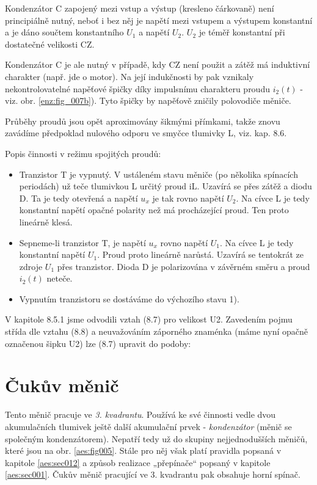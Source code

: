     \begin{tcnote}
      Kondenzátor C zapojený mezi vstup a výstup (kresleno čárkovaně) není principiálně nutný, 
      neboť i bez něj je napětí mezi vstupem a výstupem konstantní a je dáno součtem konstantního 
      \(U_1\) a napětí \(U_2\). \(U_2\) je téměř konstantní při dostatečné velikosti CZ.
      
      Kondenzátor C je ale nutný v případě, kdy CZ není použit a zátěž má induktivní charakter 
      (např. jde o motor). Na její indukčnosti by pak vznikaly nekontrolovatelné napěťové špičky 
      díky impulsnímu charakteru proudu \(i_2(t)\) - viz. obr. \ref{enz:fig_007b}). Tyto špičky by 
      napěťově zničily polovodiče měniče.
    \end{tcnote}
    
    Průběhy proudů jsou opět aproximovány šikmými přímkami, takže znovu zavádíme předpoklad
    nulového odporu ve smyčce tlumivky L, viz. kap. 8.6.
    
    Popis činnosti v režimu spojitých proudů:
    \begin{itemize}
      \item Tranzistor T je vypnutý. V ustáleném stavu měniče (po několika spínacích periodách) už 
            teče tlumivkou L určitý proud iL. Uzavírá se přes zátěž a diodu D. Ta je tedy otevřená 
            a napětí \(u_x\) je tak rovno napětí \(U_2\). Na cívce L je tedy konstantní napětí 
            opačné polarity než má procházející proud. Ten proto lineárně klesá.
      \item Sepneme-li tranzistor T, je napětí \(u_x\) rovno napětí \(U_1\). Na cívce L je tedy 
            konstantní napětí \(U_1\). Proud proto lineárně narůstá. Uzavírá se tentokrát ze zdroje 
            \(U_1\) přes tranzistor. Dioda D je polarizována v závěrném směru a proud \(i_2(t)\) 
            neteče.
      \item Vypnutím tranzistoru se dostáváme do výchozího stavu 1).
    \end{itemize}
    
    V kapitole 8.5.1 jsme odvodili vztah (8.7) pro velikost U2. Zavedením pojmu střída dle vztahu 
    (8.8) a neuvažováním záporného znaménka (máme nyní opačně označenou šipku U2) lze (8.7) upravit 
    do podoby:
    
  \section{Čukův měnič}\label{aes:sec004}
    Tento měnič pracuje ve \emph{3. kvadrantu}. Používá ke své činnosti vedle dvou akumulačních 
    tlumivek ještě další akumulační prvek - \emph{kondenzátor} (měnič se společným kondenzátorem). 
    Nepatří tedy už do skupiny nejjednodušších měničů, které jsou na obr. \ref{aes:fig005}. Stále 
    pro něj však platí pravidla popsaná v kapitole \ref{aes:sec012} a způsob realizace „přepínače“ 
    popsaný v kapitole \ref{aes:sec001}. Čukův měnič pracující ve 3. kvadrantu pak obsahuje horní 
    spínač.
    

